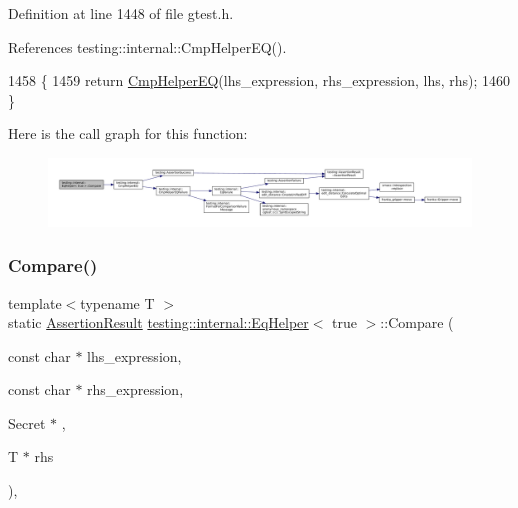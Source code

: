 Definition at line 1448 of file gtest.\+h.



References testing\+::internal\+::\+Cmp\+Helper\+E\+Q().


\begin{DoxyCode}
1458                                                         \{
1459     \textcolor{keywordflow}{return} \hyperlink{namespacetesting_1_1internal_a4638c74d9b32e971f9b321af6fafc2f1}{CmpHelperEQ}(lhs\_expression, rhs\_expression, lhs, rhs);
1460   \}
\end{DoxyCode}
Here is the call graph for this function\+:
\nopagebreak
\begin{figure}[H]
\begin{center}
\leavevmode
\includegraphics[width=350pt]{classtesting_1_1internal_1_1EqHelper_3_01true_01_4_a12c7194b2a210b61f06c912eef484ca6_cgraph}
\end{center}
\end{figure}
\mbox{\label{classtesting_1_1internal_1_1EqHelper_3_01true_01_4_a6f292601a68c8f0d49e6d48bd309b900}} 
\subsubsection{\texorpdfstring{Compare()}{Compare()}\hspace{0.1cm}{\footnotesize\ttfamily [2/2]}}
{\footnotesize\ttfamily template$<$typename T $>$ \\
static \hyperlink{classtesting_1_1AssertionResult}{Assertion\+Result} \hyperlink{classtesting_1_1internal_1_1EqHelper}{testing\+::internal\+::\+Eq\+Helper}$<$ true $>$\+::Compare (\begin{DoxyParamCaption}\item[{const char $\ast$}]{lhs\+\_\+expression,  }\item[{const char $\ast$}]{rhs\+\_\+expression,  }\item[{Secret $\ast$}]{,  }\item[{T $\ast$}]{rhs }\end{DoxyParamCaption})\hspace{0.3cm}{\ttfamily [inline]}, {\ttfamily [static]}}



